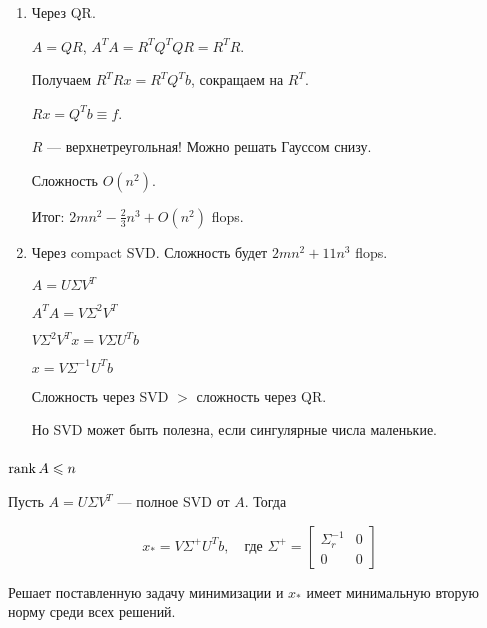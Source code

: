 \begin{enumerate}
    \item Через QR.

        $A = Q R$, $A^T A = R^T Q^T Q R = R^T R$.

        Получаем $R^T R x = R^T Q^T b$, сокращаем на $R^T$.

        $R x = Q^T b \equiv f$.

        $R$ --- верхнетреугольная! Можно решать Гауссом снизу.

        Сложность $O(n^2)$.

        Итог: $2 m n^2 - \frac{2}{3} n^3 + O(n^2)$ flops.

    \item Через compact SVD. Сложность будет $2 m n^2 + 11 n^3$ flops.

        $A = U \Sigma V^T$

        $A^T A = V \Sigma^2 V^T$

        $V \Sigma^2 V^T x = V \Sigma U^T b$

        $x = V \Sigma^{-1} U^T b$

        Сложность через SVD $>$ сложность через QR.

        Но SVD может быть полезна, если сингулярные числа маленькие.
\end{enumerate}

\subsubsection{$\operatorname{rank}{A} \leqslant n$}

\begin{theorem}
    Пусть $A = U \Sigma V^T$ --- полное SVD от $A$. Тогда

    \[
        x_* = V \Sigma^+ U^T b, \quad \text{где } \Sigma^+ = \begin{bmatrix}
            \Sigma_r^{-1} & 0 \\
            0 & 0
        \end{bmatrix}
    \]

    Решает поставленную задачу минимизации и $x_*$ имеет минимальную вторую
    норму среди всех решений.
\end{theorem}

